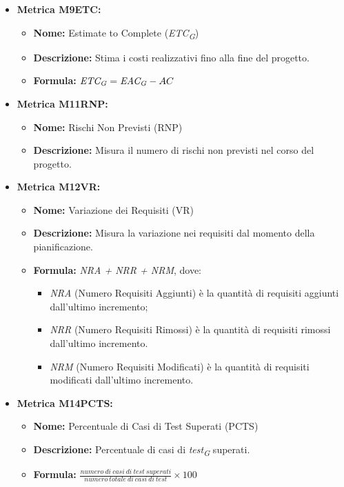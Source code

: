 \begin{itemize}
    \item \textbf{Metrica M9ETC:}
          \begin{itemize}
              \item \textbf{Nome:} Estimate to Complete (\textit{ETC}\textsubscript{\textit{G}})
              \item \textbf{Descrizione:} Stima i costi realizzativi fino alla fine del progetto.
              \item \textbf{Formula:} $\textit{ETC}\textsubscript{\textit{G}} =\textit{EAC}\textsubscript{\textit{G}} - AC$
          \end{itemize}

    \item \textbf{Metrica M11RNP:}
          \begin{itemize}
              \item \textbf{Nome:} Rischi Non Previsti (RNP)
              \item \textbf{Descrizione:} Misura il numero di rischi non previsti nel corso del progetto.
          \end{itemize}

    \item \textbf{Metrica M12VR:}
          \begin{itemize}
              \item \textbf{Nome:} Variazione dei Requisiti (VR)
              \item \textbf{Descrizione:} Misura la variazione nei requisiti dal momento della pianificazione.
              \item \textbf{Formula:} \textit{NRA + NRR + NRM}, dove:\begin{itemize}
                \item \textit{NRA} (Numero Requisiti Aggiunti) è la quantità di requisiti aggiunti dall'ultimo incremento;
                \item \textit{NRR} (Numero Requisiti Rimossi) è la quantità di requisiti rimossi dall'ultimo incremento.
                \item \textit{NRM} (Numero Requisiti Modificati) è la quantità di requisiti modificati dall'ultimo incremento.
              \end{itemize}
          \end{itemize}
    
    \item \textbf{Metrica M14PCTS:}
          \begin{itemize}
           \item \textbf{Nome:} Percentuale di Casi di Test Superati (PCTS)
           \item \textbf{Descrizione:} Percentuale di casi di \textit{test}\textsubscript{\textit{G}} superati.
           \item \textbf{Formula:} $\frac{numero \ di \ casi \ di \ test \ superati}{numero \ totale \ di \ casi \ di \ test}\times 100$
          \end{itemize}


\end{itemize}
